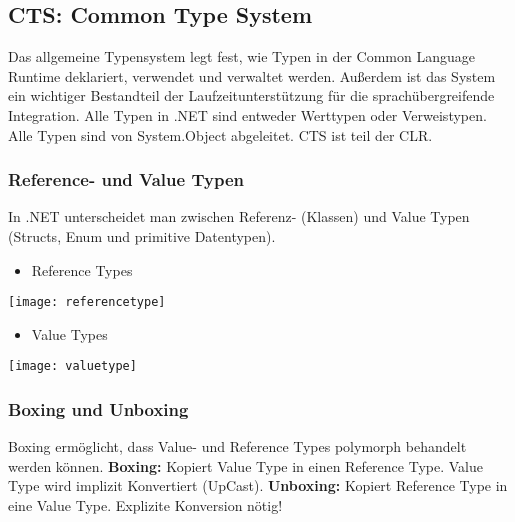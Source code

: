 \subsection{CTS: Common Type System}
Das allgemeine Typensystem legt fest, wie Typen in der Common Language Runtime deklariert, verwendet und verwaltet werden. Außerdem ist das System ein wichtiger Bestandteil der Laufzeitunterstützung für die sprachübergreifende Integration. Alle Typen in .NET sind entweder Werttypen oder Verweistypen. Alle Typen sind von System.Object abgeleitet. CTS ist teil der CLR.

\subsubsection{Reference- und Value Typen}
In .NET unterscheidet man zwischen Referenz- (Klassen) und Value Typen (Structs, Enum und primitive Datentypen).

\begin{minipage}{0,5\linewidth}
	\begin{itemize}
  		\itemsep -0.5em 
  		\item Reference Types
	\end{itemize}
	\centering
	\texttt{[image: referencetype]}	
\end{minipage}
\begin{minipage}{0,5\linewidth}
	\begin{itemize}
  		\itemsep -0.5em 
  		\item Value Types
	\end{itemize}
	\centering
	\texttt{[image: valuetype]}	  
\end{minipage}

\subsubsection{Boxing und Unboxing}
Boxing ermöglicht, dass Value- und Reference Types polymorph behandelt werden können. \textbf{Boxing:} Kopiert Value Type in einen Reference Type. Value Type wird implizit Konvertiert (UpCast). \textbf{Unboxing:} Kopiert Reference Type in eine Value Type. Explizite Konversion nötig!

